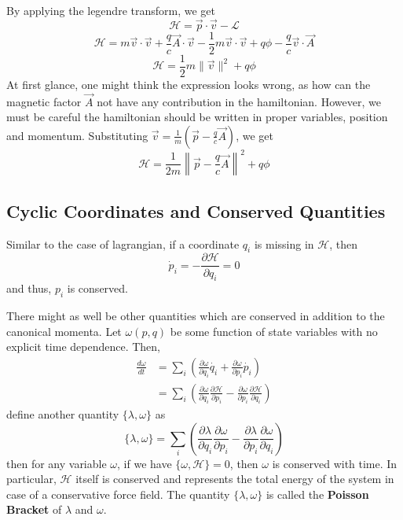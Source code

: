 \documentclass[12pt,a4paper]{report}
\newcommand{\der}[2]{\frac{d#1}{d#2}}
\newcommand{\parder}[2]{\frac{\partial#1}{\partial#2}}
\newcommand{\lagrangian}{\mathcal{L}}
\newcommand{\hamiltonian}{\mathcal{H}}
\begin{document}
By applying the legendre transform, we get
\begin{equation*}
    \hamiltonian = \vec{p} \cdot \vec{v} - \lagrangian
\end{equation*}
\begin{equation*}
    \hamiltonian = m\vec{v} \cdot \vec{v} + \frac{q}{c}\vec{A} \cdot \vec{v} - \frac{1}{2} m \vec{v}\cdot\vec{v} + q\phi - \frac{q}{c}\vec{v}\cdot\vec{A}
\end{equation*}
\begin{equation*}
    \hamiltonian = \frac{1}{2}m\| \vec{v} \|^2 + q\phi
\end{equation*}
At first glance, one might think the expression looks wrong, as how can the magnetic factor $\vec{A}$ not have any contribution in the hamiltonian. However, we must be careful the hamiltonian should be written in proper variables, position and momentum. Substituting $\vec{v} = \frac{1}{m}(\vec{p}-\frac{q}{c}\vec{A})$, we get
\begin{equation*}
    \hamiltonian = \frac{1}{2m}\left \| \vec{p}-\frac{q}{c}\vec{A} \right \|^2 + q\phi
\end{equation*}

\subsection{Cyclic Coordinates and Conserved Quantities}

Similar to the case of lagrangian, if a coordinate $q_i$ is missing in $\hamiltonian$, then
\begin{equation*}
    \dot{p}_i = -\parder{\hamiltonian}{q_i} = 0
\end{equation*}
and thus, $p_i$ is conserved.

There might as well be other quantities which are conserved in addition to the canonical momenta. Let $\omega(p, q)$ be some function of state variables with no explicit time dependence. Then,
\begin{align*}
    \der{\omega}{t} &= \sum_{i} \left( \parder{\omega}{q_i} \dot{q_i} + \parder{\omega}{p_i} \dot{p_i} \right) \\
    &= \sum_{i} \left( \parder{\omega}{q_i} \parder{\hamiltonian}{p_i} - \parder{\omega}{p_i} \parder{\hamiltonian}{q_i} \right)
\end{align*}
define another quantity $\{\lambda, \omega\}$ as
\begin{equation*}
    \{\lambda, \omega\} = \sum_{i} \left( \parder{\lambda}{q_i} \parder{\omega}{p_i} - \parder{\lambda}{p_i} \parder{\omega}{q_i} \right)
\end{equation*}
then for any variable $\omega$, if we have $\{\omega, \hamiltonian\} = 0$, then $\omega$ is conserved with time. In particular, $\hamiltonian$ itself is conserved and represents the total energy of the system in case of a conservative force field. The quantity $\{\lambda, \omega\}$ is called the \textbf{Poisson Bracket} of $\lambda$ and $\omega$.
\end{document}

